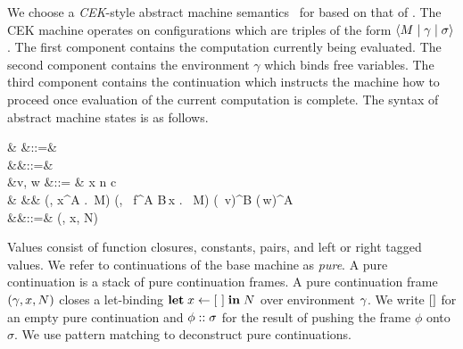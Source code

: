 \documentclass[12pt,phd,lfcs,twoside,openright,logo,leftchapter,normalheadings]{infthesis}
\theoremstyle{plain}
\theoremstyle{definition}
\begin{document}
We choose a \emph{CEK}-style abstract machine
semantics~\citep{FelleisenF86} for \BCalc{} based on that of
\citet{HillerstromLA20}.
%
The CEK machine operates on configurations which are triples of the
form $\langle M \mid \gamma \mid \sigma \rangle$. The first component contains
the computation currently being evaluated. The second component
contains the environment $\gamma$ which binds free variables. The
third component contains the continuation which instructs the machine
how to proceed once evaluation of the current computation is complete.
%
The syntax of abstract machine states is as follows.
{\small
\begin{syntax}
           & \conf \in \Conf  &::=&  \\
       &\env \in \Env   &::=& \emptyset \mid \env[x \mapsto v] \\
           &v, w \in \MVal  &::= & x \mid n \mid c \mid \Unit \mid {} \\
                                &                &\mid& (\env, \lambda x^A .\, M) \mid (\env, \Rec\, f^{A \to B}\,x . \, M)
                                                  \mid  (\Inl\, v)^B \mid (\Inr\,w)^A \\
            &\sigma \in \PureCont &::=& \nil \mid (\env, x, N) \cons \sigma \\
\end{syntax}}%
%
Values consist of function closures, constants, pairs, and left or
right tagged values.
%
We refer to continuations of the base machine as \emph{pure}.
%
A pure continuation is a stack of pure continuation frames. A pure
continuation frame $(\gamma, x, N)$ closes a let-binding $\mathbf{let} \;x
\leftarrow [~] \;\mathbf{in}\;N$ over environment $\gamma$.
%
We write $[]$ for an empty pure continuation and $\phi :: \sigma$
for the result of pushing the frame $\phi$ onto $\sigma$. We use
pattern matching to deconstruct pure continuations.
%
\end{document}
